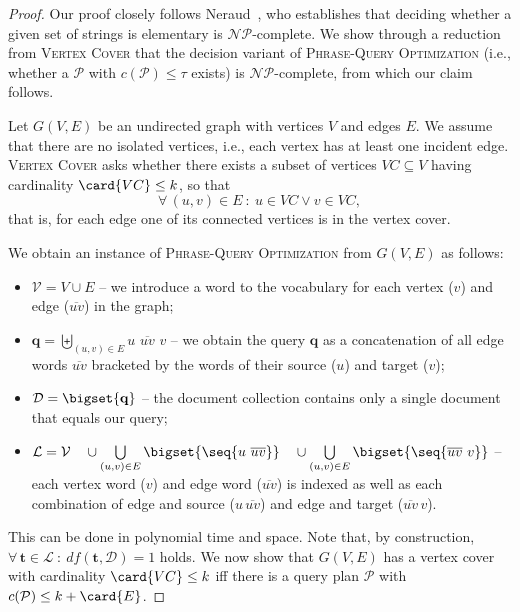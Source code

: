 \begin{proof}{} Our proof closely follows
  Neraud~\cite{Neraud:1990fk}, who establishes that deciding whether a
  given set of strings is elementary is $\mathcal{NP}$-complete. We
  show through a reduction from \textsc{Vertex Cover} that the
  decision variant of \textsc{Phrase-Query Optimization} (i.e.,
  whether a $\mathcal{P}$ with $c(\mathcal{P}) \le \tau$
  exists) is $\mathcal{NP}$-complete, from which our claim follows.

  Let $G(V,E)$ be an undirected graph with vertices $V$ and edges
  $E$. We assume that there are no isolated vertices, i.e., each
  vertex has at least one incident edge. \textsc{Vertex Cover} asks
  whether there exists a subset of vertices $VC \subseteq V$ having
  cardinality $\card{VC} \le k$, so that
  $$\forall\,(u,v) \in E \::\: u \in VC \vee v \in VC,$$ that is, for
  each edge one of its connected vertices is in the vertex cover.

  We obtain an instance of \textsc{Phrase-Query Optimization} from
  $G(V,E)$ as follows:
  \begin{itemize}
  \item $\mathcal{V} = V \cup E$ -- we introduce a word to the
    vocabulary for each vertex ($v$) and edge ($\overline{uv}$) in the
    graph;

  \item $\mathbf{q} = \!\!\biguplus\limits_{(u,v) \in E} u\,\,\overline{uv}\,\,v$
    -- we obtain the query $\mathbf{q}$ as a concatenation of all edge
    words $\overline{uv}$ bracketed by the words of their source ($u$)
    and target ($v$);

  \item $\mathcal{D} = \bigset{\mathbf{q}}$ -- the document collection
    contains only a single document that equals our query;

  \item
    $\mathcal{L} = \mathcal{V} \quad\cup
    \bigcup\limits_{(u,v) \in E}\bigset{\seq{u\,\,\overline{uv}}}
    \quad\cup \bigcup\limits_{(u,v) \in
      E}\bigset{\seq{\overline{uv}\,\,v}}$
    -- each vertex word ($v$) and edge word ($\overline{uv}$) is
    indexed as well as each combination of edge and source
    ($u\,\overline{uv}$) and edge and target ($\overline{uv}\,v$).
  \end{itemize}
  This can be done in polynomial time and space. Note that, by
  construction, $\forall{\,\mathbf{t} \in \mathcal{L}} \::\: df(\mathbf{t},
  \mathcal{D}) = 1$
  holds. We now show that $G(V,E)$ has a vertex cover with cardinality
  $\card{VC} \le k$ iff there is a query plan $\mathcal{P}$ with
  $c(\mathcal{P}) \le k + \card{E}$.
  

\end{proof}
